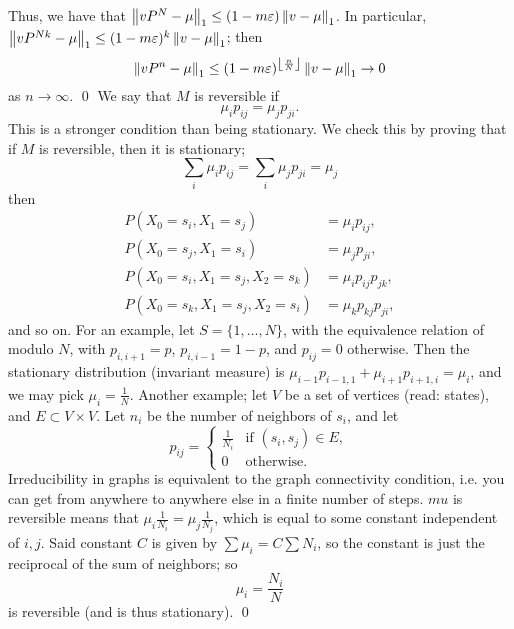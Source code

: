 Thus, we have that $\left\lVert vP^N - \mu \right\rVert_1 \leq (1 - m \varepsilon) \left\lVert v - \mu \right\rVert_1$. In particular, $\left\lVert vP^{Nk} - \mu \right\rVert_1 \leq (1 - m\varepsilon)^k \left\lVert v - \mu \right\rVert_1$; then
\[ \left\lVert v P^n - \mu \right\rVert_1 \leq (1 - m \varepsilon)^{\left\lfloor \frac{n}{N} \right\rfloor} \left\lVert v - \mu \right\rVert_1 \to 0 \]
as $n \to \infty$. \qed
\medskip\newline
We say that $M$ is reversible if
\[ \mu_i p_{ij} = \mu_j p_{ji}. \]
This is a stronger condition than being stationary. We check this by proving that if $M$ is reversible, then it is stationary;
\[ \sum_{i} \mu_i p_{ij} = \sum_i \mu_j p_{ji} = \mu_j \]
then
\begin{align*}
    P(X_0 = s_i, X_1 = s_j) &= \mu_i p_{ij}, \\
    P(X_0 = s_j, X_1 = s_i) &= \mu_j p_{ji}, \\
    P(X_0 = s_i, X_1 = s_j, X_2 = s_k) &= \mu_i p_{ij} p_{jk}, \\
    P(X_0 = s_k, X_1 = s_j, X_2 = s_i) &= \mu_k p_{kj} p_{ji},
\end{align*}
and so on. For an example, let $S = \{1, \dots, N\}$, with the equivalence relation of modulo $N$, with $p_{i, i+1} = p$, $p_{i, i - 1} = 1 - p$, and $p_{ij} = 0$ otherwise. Then the stationary distribution (invariant measure) is $\mu_{i-1} p_{i-1, 1} + \mu_{i+1} p_{i+1, i} = \mu_i$, and we may pick $\mu_i = \frac{1}{N}$.
\medskip\newline
Another example; let $V$ be a set of vertices (read: states), and $E \subset V \times V$. Let $n_i$ be the number of neighbors of $s_i$, and let
\[ p_{ij} = \begin{cases} \frac{1}{N_i} & \text{if } (s_i, s_j) \in E, \\ 0 & \text{otherwise.} \end{cases} \]
Irreducibility in graphs is equivalent to the graph connectivity condition, i.e. you can get from anywhere to anywhere else in a finite number of steps. $mu$ is reversible means that $\mu_i \frac{1}{N_i} = \mu_j \frac{1}{N_j}$, which is equal to some constant independent of $i, j$. Said constant $C$ is given by $\sum \mu_i = C \sum N_i$, so the constant is just the reciprocal of the sum of neighbors; so
\[ \mu_i = \frac{N_i}{N} \]
is reversible (and is thus stationary). \qed 